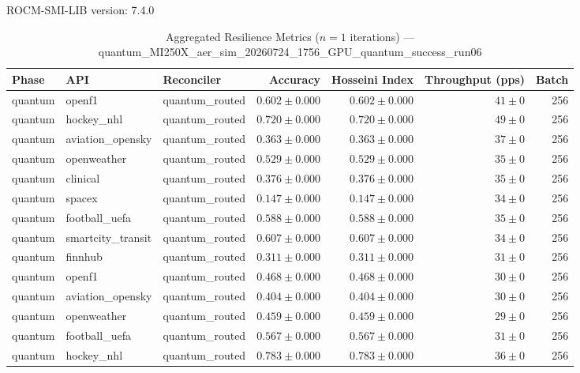 ROCM-SMI-LIB version: 7.4.0

\begin{table}[htbp]
\caption{Aggregated Resilience Metrics ($n=1$ iterations) --- quantum_MI250X_aer_sim_20260724_1756_GPU_quantum_success_run06}
\begin{tabular}{l l l r r r r}
\hline
Phase & API & Reconciler & Accuracy & Hosseini Index & Throughput (pps) & Batch \\
\hline
quantum & openf1 & quantum\_routed & $0.602\pm0.000$ & $0.602\pm0.000$ & $41\pm0$ & 256 \\
quantum & hockey\_nhl & quantum\_routed & $0.720\pm0.000$ & $0.720\pm0.000$ & $49\pm0$ & 256 \\
quantum & aviation\_opensky & quantum\_routed & $0.363\pm0.000$ & $0.363\pm0.000$ & $37\pm0$ & 256 \\
quantum & openweather & quantum\_routed & $0.529\pm0.000$ & $0.529\pm0.000$ & $35\pm0$ & 256 \\
quantum & clinical & quantum\_routed & $0.376\pm0.000$ & $0.376\pm0.000$ & $35\pm0$ & 256 \\
quantum & spacex & quantum\_routed & $0.147\pm0.000$ & $0.147\pm0.000$ & $34\pm0$ & 256 \\
quantum & football\_uefa & quantum\_routed & $0.588\pm0.000$ & $0.588\pm0.000$ & $35\pm0$ & 256 \\
quantum & smartcity\_transit & quantum\_routed & $0.607\pm0.000$ & $0.607\pm0.000$ & $34\pm0$ & 256 \\
quantum & finnhub & quantum\_routed & $0.311\pm0.000$ & $0.311\pm0.000$ & $31\pm0$ & 256 \\
quantum & openf1 & quantum\_routed & $0.468\pm0.000$ & $0.468\pm0.000$ & $30\pm0$ & 256 \\
quantum & aviation\_opensky & quantum\_routed & $0.404\pm0.000$ & $0.404\pm0.000$ & $30\pm0$ & 256 \\
quantum & openweather & quantum\_routed & $0.459\pm0.000$ & $0.459\pm0.000$ & $29\pm0$ & 256 \\
quantum & football\_uefa & quantum\_routed & $0.567\pm0.000$ & $0.567\pm0.000$ & $31\pm0$ & 256 \\
quantum & hockey\_nhl & quantum\_routed & $0.783\pm0.000$ & $0.783\pm0.000$ & $36\pm0$ & 256 \\

\end{tabular}
\end{table}
